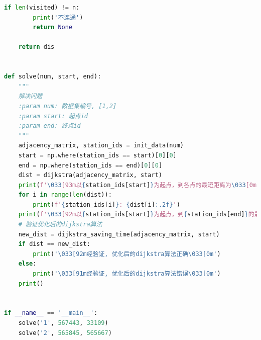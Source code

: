 \documentclass[lang=cn,11pt,a4paper]{elegantpaper}
\begin{document}
\begin{lstlisting}[language=python]
    if len(visited) != n:
        print('不连通')
        return None

    return dis


def solve(num, start, end):
    """
    解决问题
    :param num: 数据集编号, [1,2]
    :param start: 起点id
    :param end: 终点id
    """
    adjacency_matrix, station_ids = init_data(num)
    start = np.where(station_ids == start)[0][0]
    end = np.where(station_ids == end)[0][0]
    dist = dijkstra(adjacency_matrix, start)
    print(f'\033[93m以{station_ids[start]}为起点，到各点的最短距离为\033[0m')
    for i in range(len(dist)):
        print(f'{station_ids[i]}: {dist[i]:.2f}')
    print(f'\033[92m以{station_ids[start]}为起点，到{station_ids[end]}的最短距离为:{dist[end]:.2f}\033[0m')
    # 验证优化后的dijkstra算法
    new_dist = dijkstra_saving_time(adjacency_matrix, start)
    if dist == new_dist:
        print('\033[92m经验证, 优化后的dijkstra算法正确\033[0m')
    else:
        print('\033[91m经验证, 优化后的dijkstra算法错误\033[0m')
    print()


if __name__ == '__main__':
    solve('1', 567443, 33109)
    solve('2', 565845, 565667)


\end{lstlisting}
\end{document}
